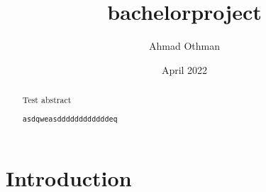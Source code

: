 \documentclass{article}
\title{bachelorproject}
\author{Ahmad Othman}
\date{April 2022}
\begin{document}
\maketitle

\begin{abstract}
Test abstract

\verb|asdqweasddddddddddddeq|

\end{abstract}

\tableofcontents

\newpage
\section{Introduction}
\cite{einstein}
\cite{burrows1994block}

\end{document}
